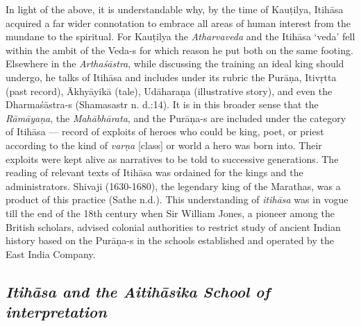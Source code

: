 In light of the above, it is understandable why, by the time of Kauṭilya, Itihāsa acquired a far wider connotation to embrace all areas of human interest from the mundane to the spiritual. For Kauṭilya the \textit{Atharvaveda} and the Itihāsa ‘veda’ fell within the ambit of the Veda-s for which reason he put both on the same footing. Elsewhere in the \textit{Arthaśāstra}, while discussing the training an ideal king should undergo, he talks of Itihāsa and includes under its rubric the Purāṇa, Itivṛtta (past record), Ākhyāyikā (tale), Udāharaṇa (illustrative story), and even the Dharmaśāstra-s (Shamasastr n. d.:14). It is in this broader sense that the \textit{Rāmāyaṇa}, the \textit{Mahābhārata}, and the Purāṇa-s are included under the category of Itihāsa — record of exploits of heroes who could be king, poet, or priest according to the kind of \textit{varṇa} [class] or world a hero was born into. Their exploits were kept alive as narratives to be told to successive generations. The reading of relevant texts of Itihāsa was ordained for the kings and the administrators. Shivaji (1630-1680), the legendary king of the Marathas, was a product of this practice (Sathe n.d.). This understanding of \textit{itihāsa} was in vogue till the end of the 18th century when Sir William Jones, a pioneer among the British scholars, advised colonial authorities to restrict study of ancient Indian history based on the Purāṇa-s in the schools established and operated by the East India Company.


\subsection*{\textit{Itihāsa and the Aitihāsika School of interpretation}}

